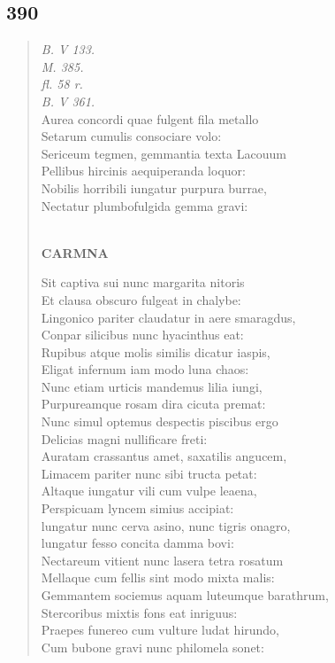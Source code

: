 \documentclass[11pt, a4paper]{report}
\begin{document}
            \subsection*{390}
      \begin{verse}
      \textit{B. V 133.} \\ \textit{M. 385.} \\ \textit{fl. 58 r.} \\ \textit{B. V 361.} \\ Aurea concordi quae fulgent fila metallo \\ Setarum cumulis consociare volo: \\ Sericeum tegmen, gemmantia texta Lacouum \\ Pellibus hircinis aequiperanda loquor: \\ Nobilis horribili iungatur purpura burrae, \\ Nectatur plumbofulgida gemma gravi: \\ 
        ﻿\pagebreak 
    \begin{center} \textbf{CARMNA} \end{center} \marginpar{[304]} Sit captiva sui nunc margarita nitoris \\ Et clausa obscuro fulgeat in chalybe: \\ Lingonico pariter claudatur in aere smaragdus, \\ Conpar silicibus nunc hyacinthus eat: \\ Rupibus atque molis similis dicatur iaspis, \\ Eligat infernum iam modo luna chaos: \\ Nunc etiam urticis mandemus lilia iungi, \\ Purpureamque rosam dira cicuta premat: \\ Nunc simul optemus despectis piscibus ergo \\ Delicias magni nullificare freti: \\ Auratam crassantus amet, saxatilis angucem, \\ Limacem pariter nunc sibi tructa petat: \\ Altaque iungatur vili cum vulpe leaena, \\ Perspicuam lyncem simius accipiat: \\ lungatur nunc cerva asino, nunc tigris onagro, \\ lungatur fesso concita damma bovi: \\ Nectareum vitient nunc lasera tetra rosatum \\ Mellaque cum fellis sint modo mixta malis: \\ Gemmantem sociemus aquam luteumque barathrum, \\ Stercoribus mixtis fons eat inriguus: \\ Praepes funereo cum vulture ludat hirundo, \\ Cum bubone gravi nunc philomela sonet: \\ 

\end{verse}
\end{document}
